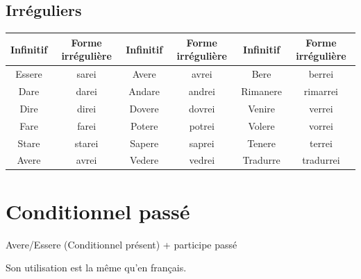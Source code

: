 \documentclass[12pt, openany]{report}
\begin{document}
\subsection{Irréguliers}
\begin{center}
    \begin{tabular}{c|c||c|c||c|c}
        Infinitif & Forme irrégulière & Infinitif & Forme irrégulière & Infinitif & Forme irrégulière\\ \hline 
        Essere & sarei & Avere & avrei & Bere & berrei\\
        Dare & darei & Andare & andrei & Rimanere & rimarrei\\
        Dire & direi & Dovere & dovrei & Venire & verrei\\
        Fare & farei & Potere & potrei & Volere & vorrei\\
        Stare & starei & Sapere & saprei & Tenere & terrei\\
        Avere & avrei & Vedere & vedrei & Tradurre & tradurrei\\
    \end{tabular}
\end{center}
\section{Conditionnel passé}
\begin{center}
    Avere/Essere (Conditionnel présent) + participe passé
\end{center}
Son utilisation est la même qu'en français. 
\end{document}
